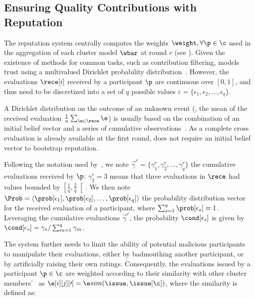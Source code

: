 \subsection{Ensuring Quality Contributions with Reputation\label{sec:radar.archi.reput}}

The reputation system centrally computes the weights $\weight, \forall \p \in \c$ used in the aggregation of each cluster model $\wbar$ at round $r$ (see ).
Given the existence of methods for common tasks, such as contribution filtering, \thecontrib models trust using a multivalued Dirichlet probability distribution~\cite{fung_DirichletBasedTrustManagement_2011}. 
However, the evaluations $\rece[i]$ received by a participant $\p$ are continuous over $[0,1]$, and thus need to be discretized into a set of $q$ possible values $\varepsilon = \{\epsilon_1, \epsilon_2, \ldots, \epsilon_q\}$. 

A Dirichlet distribution on the outcome of an unknown event (\ie, the mean of the received evaluation $\frac{1}{n}\sum_{\e \in \rece} \e$) is usually based on the combination of an initial belief vector and a series of cumulative observations~\cite{fung_DirichletBasedTrustManagement_2011}. 
As a complete cross evaluation is already available at the first round, \thecontrib does not require an initial belief vector to bootstrap reputation.

Following the notation used by~\textcite{fung_DirichletBasedTrustManagement_2011}, we note $\vec{\gamma}^r = \{\gamma_{1}^r,\gamma_{2}^r,\ldots,\gamma_{q}^r\}$ the cumulative evaluations received by $\p$: $\gamma_{2}^r=3$ means that three evaluations in $\rece$ had values bounded by $\left[\frac{1}{q},\frac{2}{q}\right[$.
We then note $\Prob = {\langle\prob[\epsilon_1],\prob[\epsilon_2], \ldots, \prob[\epsilon_q]\rangle}$ the probability distribution vector for the received evaluation of a participant, where $\sum_{s=1}^{q}\prob[\epsilon_s] = 1$.
Leveraging the cumulative evaluations $\vec{\gamma}^r$, the probability $\cond[\epsilon_s]$ is given by $\cond[\epsilon_s] = \gamma_{s} / \sum_{m=1}^{q}{\gamma_{m}}$.

The system further needs to limit the ability of potential malicious participants to manipulate their evaluations, either by badmouthing another participant, or by artificially raising their own ratings.
Consequently, the evaluations issued by a participant $\p \in \c$ are weighted according to their similarity with other cluster members'~\cite{xiong_PeerTrustsupportingreputationbased_2004} as $\e[i][j][\prime] = \e sim(\issue,\issue[\c])$, where the similarity is defined as:

